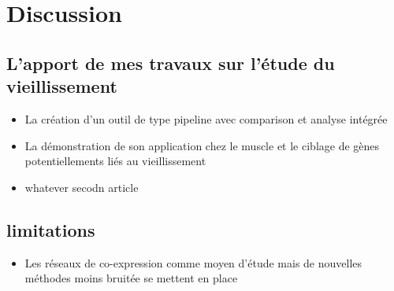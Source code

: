 \chapter*{Discussion}         %

\section{L'apport de mes travaux sur l'étude du vieillissement}

\begin{itemize}
    \item La création d'un outil de type pipeline avec comparison et analyse intégrée
    \item La démonstration de son application chez le muscle et le ciblage de gènes potentiellements liés au vieillissement
    \item whatever secodn article
\end{itemize}

\section{limitations}
\begin{itemize}
    \item Les réseaux de co-expression comme moyen d'étude mais de nouvelles méthodes moins bruitée se mettent en place %
\end{itemize}